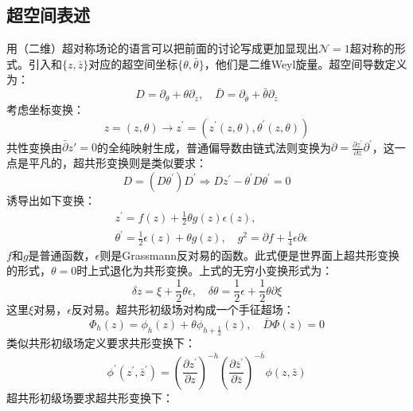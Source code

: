 \subsection{超空间表述}
用（二维）超对称场论的语言可以把前面的讨论写成更加显现出$\mathcal{N}=1$超对称的形式。引入和$\{z,\bar z\}$对应的超空间坐标$\{\theta,\bar\theta\}$，他们是二维Weyl旋量。超空间导数定义为：
\begin{equation}
	D=\partial_\theta+\theta\partial_z,\quad\bar{D}=\partial_{\bar{\theta}}+\bar{\theta}\partial_{\bar{z}}
\end{equation}
考虑坐标变换：
\begin{equation}
	z=(z,\theta)\to z^{\prime}=(z^{\prime}(z,\theta),\theta^{\prime}(z,\theta))
\end{equation}
共性变换由$\bar \partial z' = 0$的全纯映射生成，普通偏导数由链式法则变换为$\partial=\frac{\partial z^{\prime}}{\partial z}\partial^{\prime}$，这一点是平凡的，超共形变换则是类似要求：
\begin{equation}
	D=(D\theta^{\prime})D^{\prime}\Rightarrow Dz^{\prime}-\theta^{\prime}D\theta^{\prime}=0
\end{equation}
诱导出如下变换：
\begin{equation}
	\begin{aligned}&z^{\prime}=f(z)+\frac{1}{2}\theta g(z)\epsilon(z),\\&\theta^{\prime}=\frac{1}{2}\epsilon(z)+\theta g(z),\quad g^{2}=\partial f+\frac{1}{4}\epsilon\partial\epsilon\end{aligned}
\end{equation}
$f$和$g$是普通函数，$\epsilon$则是Grassmann反对易的函数。此式便是世界面上超共形变换的形式，$\theta = 0$时上式退化为共形变换。上式的无穷小变换形式为：
\begin{equation}
	\label{inf}
	\delta z=\xi+\frac{1}{2}\theta\epsilon,\quad\delta\theta=\frac{1}{2}\epsilon+\frac{1}{2}\theta\partial\xi
\end{equation}
这里$\xi$对易，$\epsilon$反对易。超共形初级场对构成一个手征超场：
\begin{equation}
	\Phi_h(z)=\phi_h(z)+\theta\phi_{h+\frac12}(z),\quad \bar D\Phi(z) = 0
\end{equation}
类似共形初级场定义要求共形变换下：
\begin{equation}
	\phi^{\prime}(z^{\prime},\bar{z}^{\prime})=\left(\frac{\partial z^{\prime}}{\partial z}\right)^{-h}\left(\frac{\partial\bar{z}^{\prime}}{\partial\bar{z}}\right)^{-\bar{h}}\phi(z,\bar{z})
\end{equation}
超共形初级场要求超共形变换下：
